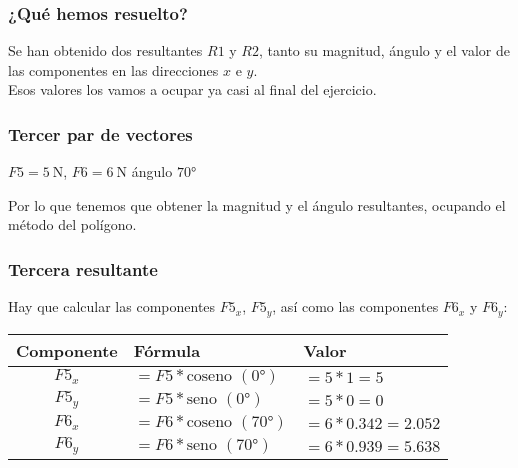 \documentclass[14pt, xcolor={usenames,dvipsnames}]{beamer}
\begin{document}
\begin{frame}
\frametitle{¿Qué hemos resuelto?}
Se han obtenido dos resultantes $R1$ y $R2$, tanto su magnitud, ángulo y el valor de las componentes en las direcciones $x$ e $y$.
\\
\bigskip
\pause
Esos valores los vamos a ocupar ya casi al final del ejercicio.
\end{frame}
\begin{frame}
\frametitle{Tercer par de vectores}
$F5 = \SI{5}{\newton}$, $F6 = \SI{6}{\newton}$  ángulo $\ang{70}$
\begin{figure}
\centering
{}
\end{figure}
Por lo que tenemos que obtener la magnitud y el ángulo resultantes, ocupando el método del polígono.
\end{frame}
\begin{frame}
\frametitle{Tercera resultante}
Hay que calcular las componentes $F5_{x}$, $F5_{y}$, así como las componentes $F6_{x}$ y $F6_{y}$:
\pause
\begin{table}
    \renewcommand{\arraystretch}{1.5}
\begin{tabular}{c | l | l}
Componente & Fórmula & Valor \\ \hline
$F5_{x}$ & $= F5 * \text{coseno } (\ang{0})$ & $= 5*1 = 5$ \\ \hline
$F5_{y}$ & $= F5 * \text{seno } (\ang{0})$ & $= 5*0 = 0$ \\ \hline
$F6_{x}$ & $= F6 * \text{coseno } (\ang{70})$ & $= 6*0.342 = 2.052$ \\ \hline
$F6_{y}$ & $= F6 * \text{seno } (\ang{70})$ & $= 6*0.939 = 5.638$ \\ \hline
\end{tabular}
\end{table}   
\end{frame}
\end{document}
